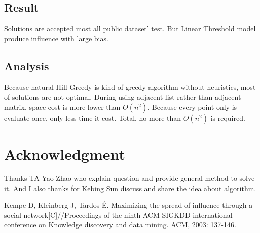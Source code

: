 \documentclass[conference,compsoc]{IEEEtran}
\begin{document}
\subsection{Result}
Solutions are accepted most all public dataset' test. But Linear Threshold model
produce influence with large bias. 

\subsection{Analysis}
Because natural Hill Greedy is kind of greedy algorithm without heuristics, most
of solutions are not optimal. During using adjacent list rather than adjacent
matrix, space cost is more lower than $O(n^2)$. Because every point only is
evaluate once, only less time it cost. Total, no more than $O(n^2)$ is required.

\section*{Acknowledgment}
Thanks TA Yao Zhao who explain question and provide general method to solve it.
And I also thanks for Kebing Sun discuss and share the idea about algorithm.


\begin{thebibliography}{1}
Kempe D, Kleinberg J, Tardos É. Maximizing the spread of influence through a
social network[C]//Proceedings of the ninth ACM SIGKDD international conference
on Knowledge discovery and data mining. ACM, 2003: 137-146.

\end{thebibliography}

\end{document}
